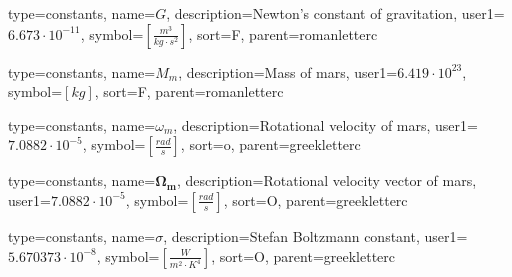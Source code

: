 {
type=constants, %
name={\ensuremath{G}}, %
description={Newton's constant of gravitation}, %
user1={$6.673\cdot10^{-11}$}, %
symbol={$\left[\frac{m^3}{kg \cdot s^{2}}\right]$}, %
sort=F, %
parent=romanletterc %
}

{
type=constants, %
name={\ensuremath{M_{m}}}, %
description={Mass of mars}, %
user1={$6.419\cdot10^{23}$}, %
symbol={$\left[kg\right]$}, %
sort=F, %
parent=romanletterc %
}

{
type=constants, %
name={\ensuremath{\omega_{m}}}, %
description={Rotational velocity of mars}, %
user1={$7.0882\cdot10^{-5}$}, %
symbol={$\left[\frac{rad}{s}\right]$}, %
sort=o, %
parent=greekletterc %
}

{
type=constants, %
name={\ensuremath{\mathbf{\Omega_{m}}}}, %
description={Rotational velocity vector of mars}, %
user1={$7.0882\cdot10^{-5}$}, %
symbol={$\left[\frac{rad}{s}\right]$}, %
sort=O, %
parent=greekletterc %
}

{
	type=constants, %
	name={\ensuremath{\sigma}}, %
	description={Stefan Boltzmann constant}, %
	user1={$5.670373\cdot10^{-8}$}, %
	symbol={$\left[\frac{W}{m^2\cdot K^4}\right]$}, %
	sort=O, %
	parent=greekletterc %
}

